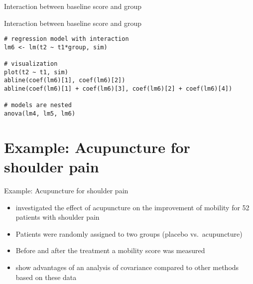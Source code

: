 \documentclass[aspectratio=169]{beamer}
\begin{document}
\begin{frame}{Interaction between baseline score and group}
\begin{center}
\end{center}
\end{frame}

{

\begin{frame}[fragile]{Interaction between baseline score and group}
\begin{lstlisting}
# regression model with interaction
lm6 <- lm(t2 ~ t1*group, sim)

# visualization
plot(t2 ~ t1, sim)
abline(coef(lm6)[1], coef(lm6)[2])
abline(coef(lm6)[1] + coef(lm6)[3], coef(lm6)[2] + coef(lm6)[4])

# models are nested
anova(lm4, lm5, lm6)
\end{lstlisting}
\end{frame}

}

\section[Example]{Example: Acupuncture for shoulder pain}

\begin{frame}{Example: Acupuncture for shoulder pain}
\begin{itemize}
  \item \citet{Kleinhenz1999} investigated the effect of acupuncture on
    the improvement of mobility for 52 patients with shoulder pain
  \item Patients were randomly assigned to two groups (placebo vs.\
    acupuncture)
  \item Before and after the treatment a mobility score was measured
  \item \citet{VickersAltman2001} show advantages of an analysis of
    covariance compared to other methods based on these data
\end{itemize}
\end{frame}
\end{document}
